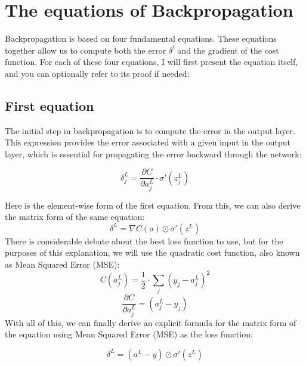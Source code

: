 \documentclass[../main]{subfiles}
\begin{document}
\section{The equations of Backpropagation}
Backpropagation is based on four fundamental equations. These equations together allow us to compute both the error $\delta^l$ and the gradient of the cost function. For each of these four equations, I will first present the equation itself, and you can optionally refer to its proof if needed:
\subsection{First equation}
The initial step in backpropagation is to compute the error in the output layer. This expression provides the error associated with a given input in the output layer, which is essential for propagating the error backward through the network:\vspace{6mm}
\begin{mdframed}[style=myequationstyle]
\begin{equation*}
    \delta_{j}^L = \frac{\partial C}{\partial a_{j}^L}\cdot\sigma'(z_{j}^L)
\end{equation*}
\end{mdframed}\vspace{4mm}
Here is the element-wise form of the first equation. From this, we can also derive the matrix form of the same equation:
\begin{equation*}
    \delta^L = \nabla C(a) \odot \sigma'(z^L)
\end{equation*}
There is considerable debate about the best loss function to use, but for the purposes of this explanation, we will use the quadratic cost function, also known as Mean Squared Error (MSE):
\begin{equation*}
    C(a_{j}^L) = \frac{1}{2}\cdot\sum_{j}(y_{j}-a_{j}^L)^2
\end{equation*}
\begin{equation*}
    \frac{\partial C}{\partial a_{j}^L} = (a_{j}^L-y_j)
\end{equation*}
With all of this, we can finally derive an explicit formula for the matrix form of the equation using Mean Squared Error (MSE) as the loss function:\vspace{6mm}
\begin{mdframed}[style=myequationstyle]
\begin{equation*}
    \delta^L = (a^L-y)\odot\sigma'(z^L)
\end{equation*}
\end{mdframed}
\end{document}
